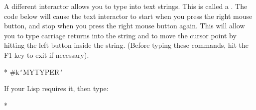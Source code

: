 A different interactor allows you to type into text strings.  This is called a
.  The code below will cause the text interactor to start
when you press the right mouse button, and stop when you press the right mouse
button again.  This will allow you to type carriage returns into the string
and to move the cursor point by hitting the left button inside the string.
(Before typing these commands, hit the F1 key to exit  
if necessary).
\begin{programexample}
* 
\#k{\tt\char`\<}MYTYPER{\tt\char`\>}
\end{programexample}
If your Lisp requires it, then type:
\begin{programexample}
* 
\end{programexample}

